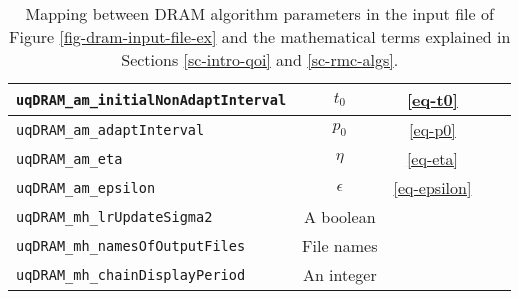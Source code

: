 \begin{sidewaystable}[h]
\begin{center}
\begin{tabular}{|l|c|c|c|c|}
\hline
\verb=uqDRAM_am_initialNonAdaptInterval= & $t_0$                               & \eqref{eq-t0}                                & \pageref{eq-t0}                                  &               \\
\hline
\verb=uqDRAM_am_adaptInterval=           & $p_0$                               & \eqref{eq-p0}                                & \pageref{eq-p0}                                  &               \\
\hline
\verb=uqDRAM_am_eta=                     & $\eta$                              & \eqref{eq-eta}                               & \pageref{eq-eta}                                 &               \\
\hline
\verb=uqDRAM_am_epsilon=                 & $\epsilon$                          & \eqref{eq-epsilon}                           & \pageref{eq-epsilon}                             &               \\
\hline
\verb=uqDRAM_mh_lrUpdateSigma2=          & A boolean                           &                                              &                                                  &               \\
\hline
\verb=uqDRAM_mh_namesOfOutputFiles=      & File names                          &                                              &                                                  &               \\
\hline
\verb=uqDRAM_mh_chainDisplayPeriod=      & An integer                          &                                              &                                                  &               \\
\hline
\end{tabular}
\caption{Mapping between DRAM algorithm parameters in the input file of Figure \ref{fig-dram-input-file-ex} and the mathematical terms explained in Sections \ref{sc-intro-qoi} and \ref{sc-rmc-algs}.
}
\label{tab-dram-map}
\end{center}
\end{sidewaystable}

